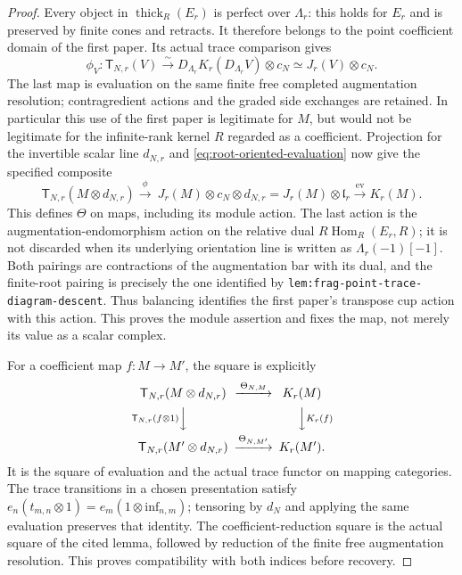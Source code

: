 \documentclass[11pt]{article}
\theoremstyle{definition}
\theoremstyle{remark}
\newcommand{\RHom}{R\operatorname{Hom}}
\begin{document}
\begin{proof}
Every object in $\operatorname{thick}_R(E_r)$ is perfect over
$\Lambda_r$: this holds for $E_r$ and is preserved by finite cones
and retracts.  It therefore belongs to the point coefficient domain
of the first paper.  Its actual trace comparison gives
\[
 \phi_V:\mathsf T_{N,r}(V)
    \xrightarrow{\sim}D_{\Lambda_r}K_r(D_{\Lambda_r}V)\otimes c_N
    \simeq J_r(V)\otimes c_N.
\]
The last map is evaluation on the same finite free completed
augmentation resolution; contragredient actions and the graded
side exchanges are retained.  In particular this use of the first
paper is legitimate for $M$, but would not be legitimate for the
infinite-rank kernel $R$ regarded as a coefficient.
Projection for the invertible scalar line $d_{N,r}$ and
\eqref{eq:root-oriented-evaluation} now give the specified composite
\[
 \mathsf T_{N,r}(M\otimes d_{N,r})
  \xrightarrow{\phi}\ J_r(M)\otimes c_N\otimes d_{N,r}
  =J_r(M)\otimes\mathfrak l_r
  \xrightarrow{\operatorname{ev}}K_r(M).
\]
This defines $\Theta$ on maps, including its module action.  The
last action is the augmentation-endomorphism action on the relative
dual $\RHom_R(E_r,R)$; it is not discarded when its underlying
orientation line is written as $\Lambda_r(-1)[-1]$.
Both pairings are contractions of the augmentation bar with its
dual, and the finite-root pairing is precisely the one identified
by \texttt{lem:frag-point-trace-diagram-descent}.  Thus balancing
identifies the first paper's transpose cup action with this action.
This proves the module assertion and fixes the map, not merely its
value as a scalar complex.

For a coefficient map $f:M\to M'$, the square is explicitly
\[
\begin{CD}
 \mathsf T_{N,r}(M\otimes d_{N,r}) @>{\Theta_{N,M}}>> K_r(M)\\
 @V{\mathsf T_{N,r}(f\otimes1)}VV @VV{K_r(f)}V\\
 \mathsf T_{N,r}(M'\otimes d_{N,r}) @>{\Theta_{N,M'}}>> K_r(M').
\end{CD}
\]
It is the square of evaluation and the actual trace functor on
mapping categories.  The trace transitions in a chosen presentation
satisfy $e_n(t_{m,n}\otimes1)=e_m(1\otimes\mathrm{inf}_{n,m})$;
tensoring by $d_N$ and applying the same evaluation preserves that
identity.  The coefficient-reduction square is the actual square
of the cited lemma, followed by reduction of the finite free
augmentation resolution.  This proves compatibility with both
indices before recovery.


\end{proof}
\end{document}
